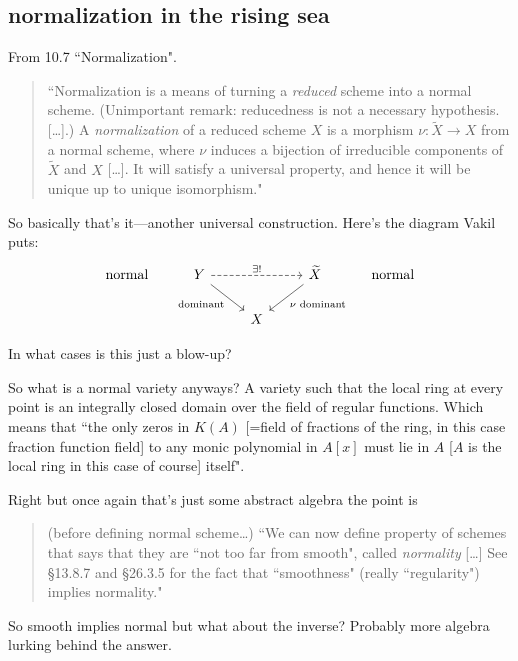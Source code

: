 \subsection*{normalization in the rising sea}


From \cite{sea} 10.7 ``Normalization".

\begin{quotation}
	``Normalization is a means of turning a \textit{reduced} scheme into a normal scheme. (Unimportant remark: reducedness is not a necessary hypothesis. […].) A \textit{normalization} of a reduced scheme \(X\) is a morphism \(\nu:\widetilde{X}\to X\) from a normal scheme, where \(\nu\) induces a bijection of irreducible components of \(\widetilde{X}\) and \(X\) […]. It will satisfy a universal property, and hence it will be unique up to unique isomorphism."
\end{quotation}
So basically that's it---another universal construction. Here's the diagram Vakil puts:
\[\begin{tikzcd}
\text{normal} &Y\arrow[rr,"\exists !",dashed]\arrow[dr,"\text{dominant} ",swap]&&\widetilde{X}\arrow[dl,"\nu\text{ dominant} "]& \text{ normal} \\
&&X
\end{tikzcd}\]

\begin{question}\leavevmode
In what cases is this just a blow-up?
\end{question}

\begin{question}\leavevmode
	So what is a normal variety anyways? A variety such that the local ring at every point is an integrally closed domain over the field of regular functions. Which means that ``the only zeros in \(K(A)\) [=field of fractions of the ring, in this case fraction function field] to any monic polynomial in \(A[x]\) must lie in \(A\) [\(A\) is the local ring in this case of course] itself".
\end{question}

Right but once again that's just some abstract algebra the point is
\begin{quotation}
	(before defining normal scheme…) ``We can now define  property of schemes that says that they are ``not too far from smooth", called \textit{normality} […] See §13.8.7 and §26.3.5 for the fact that ``smoothness" (really ``regularity") implies normality."
\end{quotation}
So smooth implies normal but what about the inverse? Probably more algebra lurking behind the answer.

